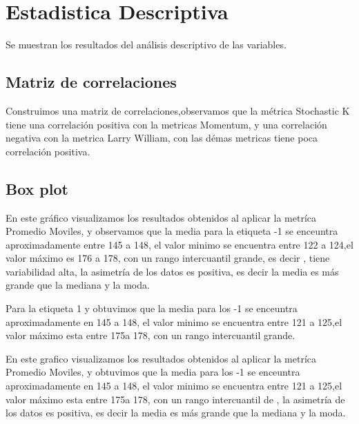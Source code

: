 \documentclass[letter, 12pt]{article}
\begin{document}
\section{Estadistica Descriptiva}

Se muestran los resultados del análisis descriptivo de las variables.

\subsection{Matriz de correlaciones}

     \begin{figure}[H]
    \centering
    \end{figure}
Construimos una matriz de correlaciones,observamos que la métrica  Stochastic K tiene una correlación positiva  con la metricas Momentum, y una  correlación negativa con la metrica Larry William, con las démas metricas tiene poca correlación positiva.
\subsection{Box plot}

     \begin{figure}[H]
    \centering
    \end{figure}
En este gráfico visualizamos los resultados obtenidos al aplicar la metríca Promedio Moviles, y observamos que la media para la etiqueta -1 se enceuntra aproximadamente entre 145 a 148, el valor minimo se encuentra entre 122 a 124,el valor máximo es 176 a 178, con un rango intercuantil grande, es decir , tiene  variabilidad alta,  la asimetría de los datos es positiva, es decir la media es más grande que la mediana y la moda.

Para la etiqueta 1 y obtuvimos que la media para los -1 se enceuntra aproximadamente en 145 a 148, el valor minimo se encuentra entre 121 a 125,el valor máximo esta entre  175a 178, con un rango intercuantil grande.
    \begin{figure}[H]
    \centering
    \end{figure}
En este grafico visualizamos los resultados obtenidos al aplicar la metríca Promedio Moviles, y obtuvimos que la media para los -1 se enceuntra aproximadamente en 145 a 148, el valor minimo se encuentra entre 121 a 125,el valor máximo esta entre  175a 178, con un rango intercuantil de  , la asimetría de los datos es positiva, es decir la media es más grande que la mediana y la moda.
\end{document}

